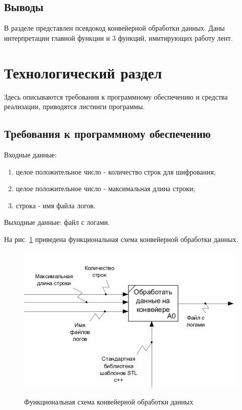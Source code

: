 \documentclass[a4paper,12pt]{article}
\begin{document}
	\mbox{}
	\newpage

\subsection*{Выводы}

В разделе представлен псевдокод конвейерной обработки данных.
Даны интерпретации главной функции
и 3 функций, имитирующих работу лент.
\newpage

\section{Технологический раздел}

Здесь описываются требования к программному 
обеспечению и средства реализации, приводятся листинги 
программы.

\subsection{Требования к программному обеспечению}

\begin{flushleft}
Входные данные: 
	 \begin{enumerate} 
	 \item[1)] целое положительное число - количество строк для шифрования;
	 \item[2)] целое положительное число - максимальная длина строки;
	 \item[3)] строка - имя файла логов.
	 \end{enumerate}
	
	Выходные данные: файл с логами.

\end{flushleft}
	
На рис. \ref{fig:idef0} приведена 
функциональная схема 
конвейерной обработки данных.
        
\begin{figure}[h!]
\begin{center}
{\includegraphics[scale = 0.7]{img/idef0.jpg}}
\caption{Функциональная схема 
конвейерной обработки данных}
\label{fig:idef0}
\end{center}
\end{figure}
	
\end{document}
